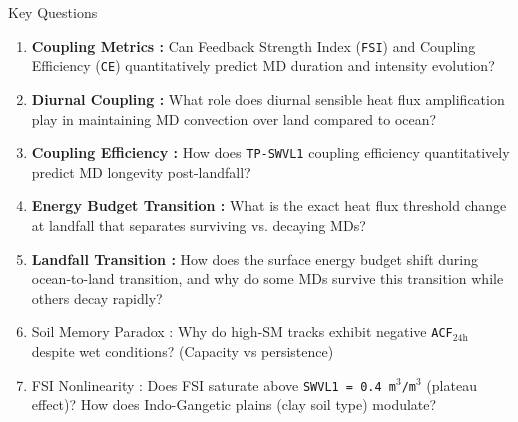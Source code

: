 \documentclass[8pt, aspectratio=169]{beamer}
\begin{document}
\begin{frame}{}
\begin{block}{Key Questions}
\begin{enumerate}
            \item \textbf{Coupling Metrics :} Can Feedback Strength Index (\texttt{FSI}) and Coupling Efficiency (\texttt{CE}) quantitatively predict MD duration and intensity evolution?
            \item \textbf{Diurnal Coupling :} What role does diurnal sensible heat flux amplification play in maintaining MD convection over land compared to ocean?
            \item \textbf{Coupling Efficiency :} How does \texttt{TP-SWVL1} coupling efficiency quantitatively predict MD longevity post-landfall?
            \item \textbf{Energy Budget Transition :} What is the exact heat flux threshold change at landfall that separates surviving vs. decaying MDs?
            \item \textbf{Landfall Transition :} How does the surface energy budget shift during ocean-to-land transition, and why do some MDs survive this transition while others decay rapidly?
            \item Soil Memory Paradox : Why do high-SM tracks exhibit negative \texttt{ACF$_{\text{24h}}$} despite wet conditions? (Capacity vs persistence) %
            \item FSI Nonlinearity : Does FSI saturate above \texttt{SWVL1 = 0.4 m$^3$/m$^3$} (plateau effect)? How does Indo-Gangetic plains (clay soil type) modulate? %

\end{enumerate}
\end{block}
\end{frame}
\end{document}
